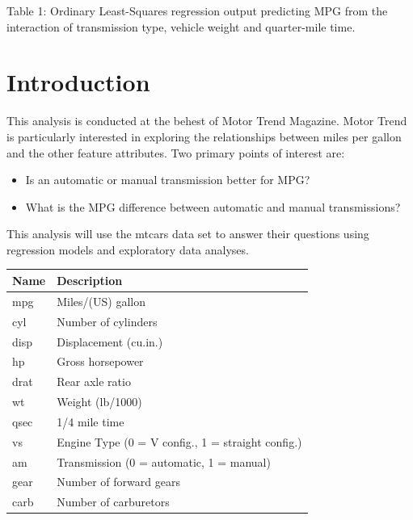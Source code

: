 \documentclass{article}
\begin{document}
{\begin{center}
\begin{minipage}{0.70\textwidth}
Table 1: Ordinary Least-Squares regression output predicting MPG from the interaction of transmission type, vehicle weight and quarter-mile time.
\end{minipage}
\end{center}


\section*{Introduction}

This analysis is conducted at the behest of Motor Trend Magazine. Motor Trend is particularly interested in exploring the relationships between miles per gallon and the other feature attributes. Two primary points of interest are:

\begin{itemize}
\item Is an automatic or manual transmission better for MPG?
\item What is the MPG difference between automatic and manual transmissions?
\end{itemize}

This analysis will use the mtcars data set to answer their questions using regression models and exploratory data analyses.

\begin{center}
\begin{minipage}{0.55\textwidth} 
\begin{tabular}{ll}
  \hline
Name & Description \\ 
  \hline
mpg & Miles/(US) gallon \\ 
  cyl & Number of cylinders \\ 
  disp & Displacement (cu.in.) \\ 
  hp & Gross horsepower \\ 
  drat & Rear axle ratio \\ 
  wt & Weight (lb/1000) \\ 
  qsec & 1/4 mile time \\ 
  vs & Engine Type (0 = V config., 1 = straight config.) \\ 
  am & Transmission (0 = automatic, 1 = manual) \\ 
  gear & Number of forward gears \\ 
  carb & Number of carburetors \\ 
   \hline
\end{tabular}


\end{minipage}
\end{center}}
\end{document}
